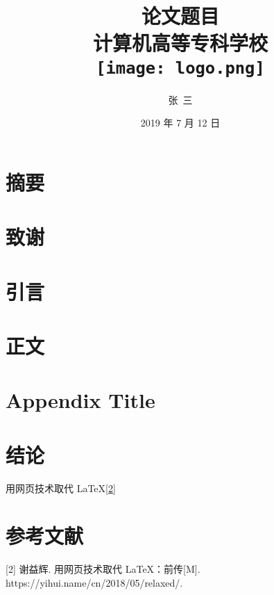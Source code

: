 \documentclass[12pt,twoside]{ctexrep}
\title{
{论文题目}\\
{\large 计算机高等专科学校}\\
{\texttt{[image: logo.png]}}
}
\author{张\ 三}
\date{2019 年 7 月 12 日}
\begin{document}
\maketitle

\chapter*{摘要}
\zhlipsum[1]
 
\chapter*{致谢}
\zhlipsum[1]
 
\tableofcontents

\chapter{引言}
\zhlipsum[1-2]

\chapter{正文}
\zhlipsum[1-15]

\appendix
\chapter{Appendix Title}
\zhlipsum[1]

\chapter{结论}
用网页技术取代 \LaTeX{}{[}\protect\hyperlink{ref-weborlatex}{2}{]}

\chapter*{参考文献}
\leavevmode\hypertarget{ref-weborlatex}{}%
{[}2{]} 谢益辉. 用网页技术取代 LaTeX：前传{[}M{]}.
https://yihui.name/cn/2018/05/relaxed/.
\end{document}
